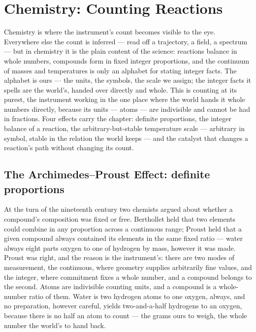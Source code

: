 \chapter{Chemistry: Counting Reactions}
\label{chap:chemistry-counting-reactions}

Chemistry is where the instrument's count becomes visible to the eye. Everywhere else the count is inferred
--- read off a trajectory, a field, a spectrum --- but in chemistry it is the plain content of the science:
reactions balance in whole numbers, compounds form in fixed integer proportions, and the continuum of masses
and temperatures is only an alphabet for stating integer facts. The alphabet is ours --- the units, the
symbols, the scale we assign; the integer facts it spells are the world's, handed over directly and whole.
This is counting at its purest, the instrument working in the one place where the world hands it whole numbers
directly, because its units --- atoms --- are indivisible and cannot be had in fractions. Four effects carry
the chapter: definite proportions, the integer balance of a reaction, the arbitrary-but-stable temperature
scale --- arbitrary in symbol, stable in the relation the world keeps --- and the catalyst that changes a
reaction's path without changing its count.

\section{The Archimedes--Proust Effect: definite proportions}
\label{se:archimedes-proust}

At the turn of the nineteenth century two chemists argued about whether a compound's composition was fixed or
free. Berthollet held that two elements could combine in any proportion across a continuous range; Proust held
that a given compound always contained its elements in the same fixed ratio --- water always eight parts
oxygen to one of hydrogen by mass, however it was made. Proust was right, and the reason is the instrument's:
there are two modes of measurement, the continuous, where geometry supplies arbitrarily fine values, and the
integer, where commitment fixes a whole number, and a compound belongs to the second. Atoms are indivisible
counting units, and a compound is a whole-number ratio of them. Water is two hydrogen atoms to one oxygen,
always, and no preparation, however careful, yields two-and-a-half hydrogens to an oxygen, because there is no
half an atom to count --- the grams ours to weigh, the whole number the world's to hand back.

